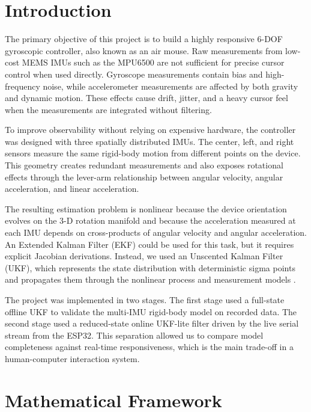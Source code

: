 \documentclass[conference]{IEEEtran}
\begin{document}
\section{Introduction}
The primary objective of this project is to build a highly responsive 6-DOF gyroscopic controller, also known as an air mouse. Raw measurements from low-cost MEMS IMUs such as the MPU6500 are not sufficient for precise cursor control when used directly. Gyroscope measurements contain bias and high-frequency noise, while accelerometer measurements are affected by both gravity and dynamic motion. These effects cause drift, jitter, and a heavy cursor feel when the measurements are integrated without filtering.

To improve observability without relying on expensive hardware, the controller was designed with three spatially distributed IMUs. The center, left, and right sensors measure the same rigid-body motion from different points on the device. This geometry creates redundant measurements and also exposes rotational effects through the lever-arm relationship between angular velocity, angular acceleration, and linear acceleration.

The resulting estimation problem is nonlinear because the device orientation evolves on the 3-D rotation manifold and because the acceleration measured at each IMU depends on cross-products of angular velocity and angular acceleration. An Extended Kalman Filter (EKF) could be used for this task, but it requires explicit Jacobian derivations. Instead, we used an Unscented Kalman Filter (UKF), which represents the state distribution with deterministic sigma points and propagates them through the nonlinear process and measurement models \cite{kalman1960,julier2004,wan2000}.

The project was implemented in two stages. The first stage used a full-state offline UKF to validate the multi-IMU rigid-body model on recorded data. The second stage used a reduced-state online UKF-lite filter driven by the live serial stream from the ESP32. This separation allowed us to compare model completeness against real-time responsiveness, which is the main trade-off in a human-computer interaction system.

\section{Mathematical Framework}
\end{document}
